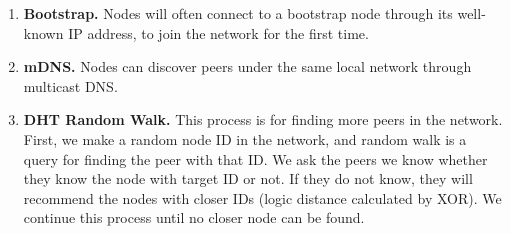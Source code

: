 \begin{enumerate}
    \item \textbf{Bootstrap.} Nodes will often connect to a bootstrap node through its well-known IP address, to join the network for the first time.
    \item \textbf{mDNS.} Nodes can discover peers under the same local network through multicast DNS.
    \item \textbf{DHT Random Walk.} This process is for finding more peers in the network. First, we make a random node ID in the network, and random walk is a query for finding the peer with that ID.
          We ask the peers we know whether they know the node with target ID or not.
          If they do not know, they will recommend the nodes with closer IDs (logic distance calculated by XOR). We continue this process until no closer node can be found.
\end{enumerate}

